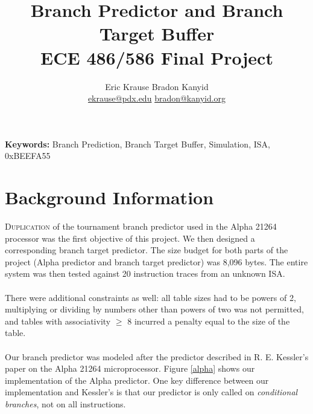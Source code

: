 \documentclass[twocolumn]{article}
\title{\textbf{Branch Predictor and Branch Target Buffer} \\
ECE 486/586 Final Project }
\author{Eric Krause \hspace{1.4in} Bradon Kanyid\\
\url{ekrause@pdx.edu} \hspace{1in} \url{bradon@kanyid.org}}
\begin{document}
\textbf{Keywords:} Branch Prediction, Branch Target Buffer, Simulation,  ISA, 0xBEEFA55

\section{Background Information}
\lettrine{D}{uplication} of the tournament branch predictor used in the Alpha 21264 processor was the first objective of this project.  We then designed a corresponding branch target predictor.  The size budget for both parts of the project (Alpha predictor and branch target predictor) was 8,096 bytes.  The entire system was then tested against 20 instruction traces from an unknown ISA. \\\\
There were additional constraints as well: all table sizes had to be powers of 2, multiplying or dividing by numbers other than powers of two was not permitted, and tables with associativity $\ge$ 8 incurred a penalty equal to the size of the table.\\\\
Our branch predictor was modeled after the predictor described in R. E. Kessler's paper on the Alpha 21264 microprocessor.  Figure \ref{alpha} shows our implementation of the Alpha predictor.  One key difference between our implementation and Kessler's is that our predictor is only called on \textit{conditional branches}, not on all instructions.\\
\end{document}
